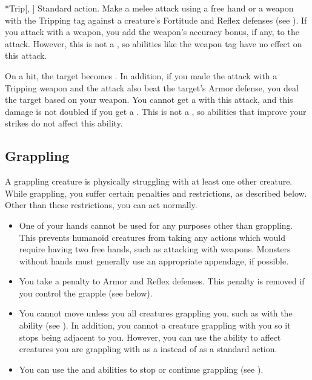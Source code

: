         \begin{activeability}*{Trip}[, ]
            \abilityusagetime Standard action.
            \rankline
            Make a melee attack using a free hand or a weapon with the Tripping tag against a creature's Fortitude and Reflex defenses (see ).
            If you attack with a weapon, you add the weapon's accuracy bonus, if any, to the attack.
            However, this is not a , so abilities like the  weapon tag have no effect on this attack.

            On a hit, the target becomes \prone.
            In addition, if you made the attack with a Tripping weapon and the attack also beat the target's Armor defense, you deal the target  based on your weapon.
            You cannot get a  with this attack, and this damage is not doubled if you get a .
            This is not a , so abilities that improve your strikes do not affect this ability.
        \end{activeability}

    \subsection{Grappling}\label{Grappling}
        A grappling creature is physically struggling with at least one other creature.
        While grappling, you suffer certain penalties and restrictions, as described below.
        Other than these restrictions, you can act normally.
        \begin{itemize}
            \item One of your hands cannot be used for any purposes other than grappling.
                This prevents humanoid creatures from taking any actions which would require having two free hands, such as attacking with  weapons.
                Monsters without hands must generally use an appropriate appendage, if possible.
            \item You take a  penalty to Armor and Reflex defenses.
                This penalty is removed if you control the grapple (see below).
            \item You cannot move unless you  all creatures grappling you, such as with the  ability (see ).
                In addition, you cannot  a creature grappling with you so it stops being adjacent to you.
                However, you can use the  ability to affect creatures you are grappling with as a  instead of as a standard action.
            \item You can use the  and  abilities to stop or continue grappling (see ).
        \end{itemize}

